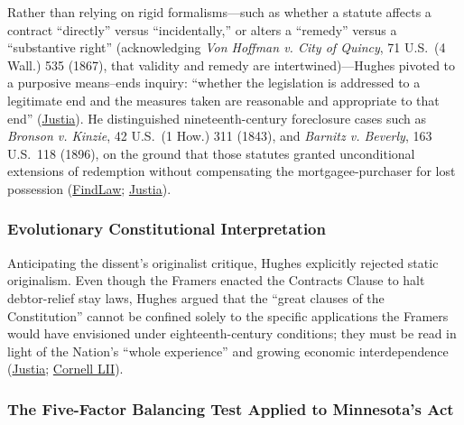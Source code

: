\documentclass[12pt]{article}
\begin{document}
Rather than relying on rigid formalisms---such as whether a statute affects a contract ``directly'' versus ``incidentally,'' or alters a ``remedy'' versus a ``substantive right'' (acknowledging \emph{Von Hoffman v. City of Quincy}, 71 U.S.\ (4 Wall.) 535 (1867), that validity and remedy are intertwined)---Hughes pivoted to a purposive means--ends inquiry: ``whether the legislation is addressed to a legitimate end and the measures taken are reasonable and appropriate to that end'' (\href{https://supreme.justia.com/cases/federal/us/290/398/}{Justia}). He distinguished nineteenth-century foreclosure cases such as \emph{Bronson v. Kinzie}, 42 U.S.\ (1 How.) 311 (1843), and \emph{Barnitz v. Beverly}, 163 U.S.\ 118 (1896), on the ground that those statutes granted unconditional extensions of redemption without compensating the mortgagee-purchaser for lost possession (\href{https://caselaw.findlaw.com/court/us-supreme-court/290/398.html}{FindLaw}; \href{https://supreme.justia.com/cases/federal/us/290/398/}{Justia}).

\subsubsection{Evolutionary Constitutional Interpretation}

Anticipating the dissent's originalist critique, Hughes explicitly rejected static originalism. Even though the Framers enacted the Contracts Clause to halt debtor-relief stay laws, Hughes argued that the ``great clauses of the Constitution'' cannot be confined solely to the specific applications the Framers would have envisioned under eighteenth-century conditions; they must be read in light of the Nation's ``whole experience'' and growing economic interdependence (\href{https://supreme.justia.com/cases/federal/us/290/398/}{Justia}; \href{https://www.law.cornell.edu/constitution-conan/article-1/section-10/clause-1/blaisdell-case-and-state-modifications-to-private-contracts}{Cornell LII}).

\subsubsection{The Five-Factor Balancing Test Applied to Minnesota's Act}
\end{document}
